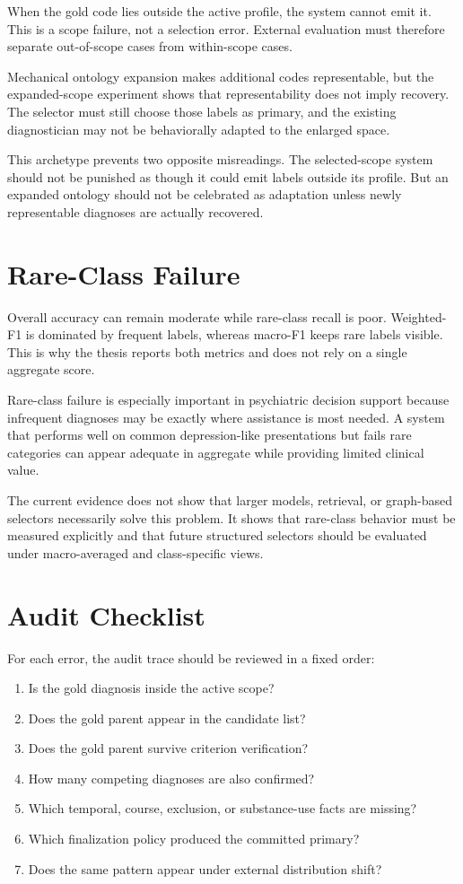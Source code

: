 When the gold code lies outside the active profile, the system cannot emit it. This is a scope failure, not a selection error. External evaluation must therefore separate out-of-scope cases from within-scope cases.

Mechanical ontology expansion makes additional codes representable, but the expanded-scope experiment shows that representability does not imply recovery. The selector must still choose those labels as primary, and the existing diagnostician may not be behaviorally adapted to the enlarged space.

This archetype prevents two opposite misreadings. The selected-scope system should not be punished as though it could emit labels outside its profile. But an expanded ontology should not be celebrated as adaptation unless newly representable diagnoses are actually recovered.

\section{Rare-Class Failure}

Overall accuracy can remain moderate while rare-class recall is poor. Weighted-F1 is dominated by frequent labels, whereas macro-F1 keeps rare labels visible. This is why the thesis reports both metrics and does not rely on a single aggregate score.

Rare-class failure is especially important in psychiatric decision support because infrequent diagnoses may be exactly where assistance is most needed. A system that performs well on common depression-like presentations but fails rare categories can appear adequate in aggregate while providing limited clinical value.

The current evidence does not show that larger models, retrieval, or graph-based selectors necessarily solve this problem. It shows that rare-class behavior must be measured explicitly and that future structured selectors should be evaluated under macro-averaged and class-specific views.

\section{Audit Checklist}

For each error, the audit trace should be reviewed in a fixed order:

\begin{enumerate}[label=\arabic*.]
\item Is the gold diagnosis inside the active scope?
\item Does the gold parent appear in the candidate list?
\item Does the gold parent survive criterion verification?
\item How many competing diagnoses are also confirmed?
\item Which temporal, course, exclusion, or substance-use facts are missing?
\item Which finalization policy produced the committed primary?
\item Does the same pattern appear under external distribution shift?
\end{enumerate}

